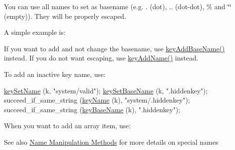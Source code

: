 You can use all names to set as basename (e.\+g. . (dot), .. (dot-\/dot), \% and \char`\"{}\char`\"{} (empty)). They will be properly escaped.

A simple example is\+: 
 If you want to add and not change the basename, use \hyperlink{group__keyname_gaa942091fc4bd5c2699e49ddc50829524}{key\+Add\+Base\+Name()} instead. If you do not want escaping, use \hyperlink{group__keyname_gaa70593a2c772c4b7bc33423b9b10a270}{key\+Add\+Name()} instead.

To add an inactive key name, use\+: 
\begin{DoxyCodeInclude}
        \hyperlink{group__keyname_ga7699091610e7f3f43d2949514a4b35d9}{keySetName} (k, \textcolor{stringliteral}{"system/valid"});
        \hyperlink{group__keyname_ga6e804bd453f98c28b0ff51430d1df407}{keySetBaseName} (k, \textcolor{stringliteral}{".hiddenkey"});
        succeed\_if\_same\_string (\hyperlink{group__keyname_ga8e805c726a60da921d3736cda7813513}{keyName} (k), \textcolor{stringliteral}{"system/.hiddenkey"});
        succeed\_if\_same\_string (\hyperlink{group__keyname_gaaff35e7ca8af5560c47e662ceb9465f5}{keyBaseName} (k), \textcolor{stringliteral}{".hiddenkey"});
\end{DoxyCodeInclude}
 When you want to add an array item, use\+: 
 \begin{DoxySeeAlso}{See also}
\hyperlink{group__keyname}{Name Manipulation Methods} for more details on special names
\end{DoxySeeAlso}

